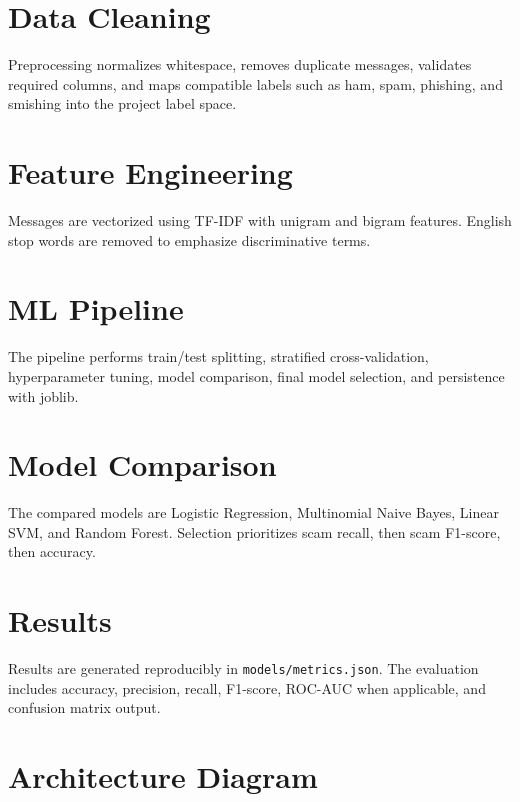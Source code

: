 \documentclass[12pt]{article}
\begin{document}
\section{Data Cleaning}
Preprocessing normalizes whitespace, removes duplicate messages, validates required columns, and maps compatible labels such as ham, spam, phishing, and smishing into the project label space.

\section{Feature Engineering}
Messages are vectorized using TF-IDF with unigram and bigram features. English stop words are removed to emphasize discriminative terms.

\section{ML Pipeline}
The pipeline performs train/test splitting, stratified cross-validation, hyperparameter tuning, model comparison, final model selection, and persistence with joblib.

\section{Model Comparison}
The compared models are Logistic Regression, Multinomial Naive Bayes, Linear SVM, and Random Forest. Selection prioritizes scam recall, then scam F1-score, then accuracy.

\section{Results}
Results are generated reproducibly in \texttt{models/metrics.json}. The evaluation includes accuracy, precision, recall, F1-score, ROC-AUC when applicable, and confusion matrix output.

\section{Architecture Diagram}
\begin{center}
\end{center}
\end{document}
